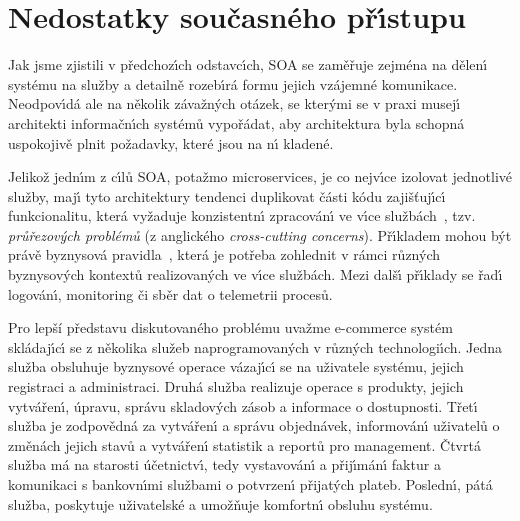 \section{Nedostatky současného př\'{\i}stupu}\label{sec:shortcomings}

Jak jsme zjistili v předchoz\'{\i}ch odstavc\'{\i}ch, \gls{SOA} se zaměřuje zejména na
dělen\'{\i} systému na služby a detailně rozeb\'{\i}rá formu jejich vzájemné komunikace.
Neodpov\'{\i}dá ale na několik závažn\'ych otázek, se kter\'ymi se v praxi musej\'{\i}
architekti informačn\'{\i}ch systémů vypořádat, aby architektura byla schopná uspokojivě
plnit požadavky, které jsou na n\'{\i} kladené.

Jelikož jedn\'{\i}m z c\'{\i}lů \gls{SOA}, potažmo microservices, je co nejv\'{\i}ce izolovat
jednotlivé služby, maj\'{\i} tyto architektury tendenci duplikovat části kódu
zajišťuj\'{\i}c\'{\i} funkcionalitu, která vyžaduje konzistentn\'{\i} zpracován\'{\i} ve v\'{\i}ce
službách~\cite{cerny2017disambiguation}, tzv. \textit{průřezov\'ych
problémů} (z anglického \textit{cross-cutting concerns}).
Př\'{\i}kladem mohou b\'yt právě byznysová pravidla~\cite{cemus2014aspect}, která je potřeba
zohlednit v rámci různ\'ych byznysov\'ych kontextů realizovan\'ych ve v\'{\i}ce službách.
Mezi dalš\'{\i} př\'{\i}klady se řad\'{\i} logován\'{\i}, monitoring či sběr dat
o telemetrii procesů.

Pro lepší představu diskutovaného problému uvažme e-commerce systém
skládaj\'{\i}c\'{\i} se z několika služeb naprogramovan\'ych v různ\'ych technologi\'{\i}ch.
Jedna služba obsluhuje byznysové operace vázaj\'{\i}c\'{\i}
se na uživatele systému, jejich registraci a administraci. Druhá
služba realizuje operace s produkty, jejich vytvářen\'{\i}, úpravu,
správu skladov\'ych zásob a informace o dostupnosti. Třet\'{\i} služba je
zodpovědná za vytvářen\'{\i} a správu objednávek, informován\'{\i} uživatelů
o změnách jejich stavů a vytvářen\'{\i} statistik a reportů pro management.
Čtvrtá služba má na starosti účetnictv\'{\i}, tedy vystavován\'{\i} a přij\'{\i}mán\'{\i}
faktur a komunikaci s bankovn\'{\i}mi službami o potvrzen\'{\i} přijat\'ych plateb.
Posledn\'{\i}, pátá služba, poskytuje uživatelské a umožňuje komfortn\'{\i} obsluhu systému.

